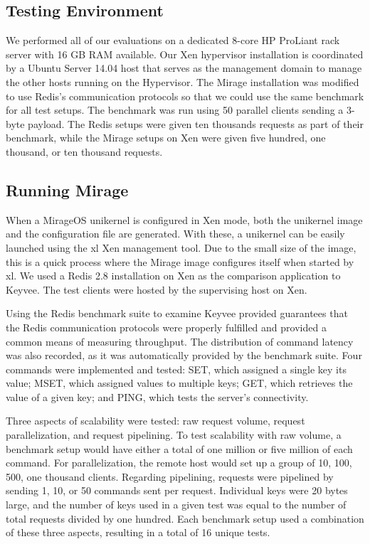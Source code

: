 \documentclass[english,10pt,twocolumn]{article}
\begin{document}
\subsection{Testing Environment}
We performed all of our evaluations on a dedicated 8-core HP ProLiant rack server with 16 GB RAM available.
Our Xen hypervisor installation is coordinated by a Ubuntu Server 14.04 host that serves as the management domain to manage the other hosts running on the Hypervisor.
The Mirage installation was modified to use Redis's communication protocols so that we could use the same benchmark for all test setups. The benchmark was run using 50 parallel clients sending a 3-byte payload.
The Redis setups were given ten thousands requests as part of their benchmark, while the Mirage setups on Xen were given five hundred, one thousand, or ten thousand requests.

\subsection{Running Mirage}


When a MirageOS unikernel is configured in Xen mode, both the unikernel image and the configuration file are generated.
With these, a unikernel can be easily launched using the xl Xen management tool.
Due to the small size of the image, this is a quick process where the Mirage image configures itself when started by xl.
We used a Redis 2.8 installation on Xen as the comparison application to Keyvee.
The test clients were hosted by the supervising host on Xen.

Using the Redis benchmark suite to examine Keyvee provided guarantees that the Redis communication protocols were properly fulfilled and provided a common means of measuring throughput.
The distribution of command latency was also recorded, as it was automatically provided by the benchmark suite.
Four commands were implemented and tested: SET, which assigned a single key its value; MSET, which assigned values to multiple keys; GET, which retrieves the value of a given key; and PING, which tests the server's connectivity.

Three aspects of scalability were tested: raw request volume, request parallelization, and request pipelining.
To test scalability with raw volume, a benchmark setup would have either a total of one million or five million of each command.
For parallelization, the remote host would set up a group of 10, 100, 500, one thousand clients.
Regarding pipelining, requests were pipelined by sending 1, 10, or 50 commands sent per request.
Individual keys were 20 bytes large, and the number of keys used in a given test was equal to the number of total requests divided by one hundred.
Each benchmark setup used a combination of these three aspects, resulting in a total of 16 unique tests.
\end{document}
